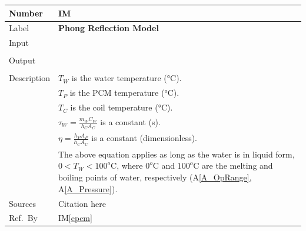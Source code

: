 \documentclass[12pt]{article}
\newcommand{\colAwidth}{0.13\textwidth}
\newcommand{\colBwidth}{0.82\textwidth}
\newcommand{\aref}[1]{A\ref{#1}}
\newcounter{instnum} %
\newcommand{\iref}[1]{IM\ref{#1}}
\begin{document}
\noindent
\begin{minipage}{\textwidth}
	\renewcommand*{\arraystretch}{1.5}
	\begin{tabular}{| p{\colAwidth} | p{\colBwidth}|}
		\hline
		\rowcolor[gray]{0.9}
		Number& IM{instnum}\theinstnum \label{ewat}\\
		\hline
		Label& \bf Phong Reflection Model\\
		\hline
		Input& \\
		& \\
		\hline
		Output& \\
		& \\
		\hline
		Description&$T_W$ is the water temperature (\si{\celsius}).\\
		&$T_P$ is the PCM temperature (\si{\celsius}).\\
		&$T_C$ is the coil temperature (\si{\celsius}).\\
		&$\tau_W = \frac{m_W C_W}{h_C A_C}$ is a constant (\si{\second}).\\
		&$\eta = \frac{h_P A_P}{h_C A_C}$ is a constant (dimensionless).\\
		& The above equation applies as long as the water is in liquid form,
		$0<T_W<100^o\text{C}$, where $0^o\text{C}$ and $100^o\text{C}$ are the 
		melting
		and boiling points of water, respectively (\aref{A_OpRange}, 
		\aref{A_Pressure}).
		\\
		\hline
		Sources& Citation here \\
		\hline
		Ref.\ By & \iref{epcm}\\
		\hline
	\end{tabular}
\end{minipage}\\

~\newline
\end{document}
